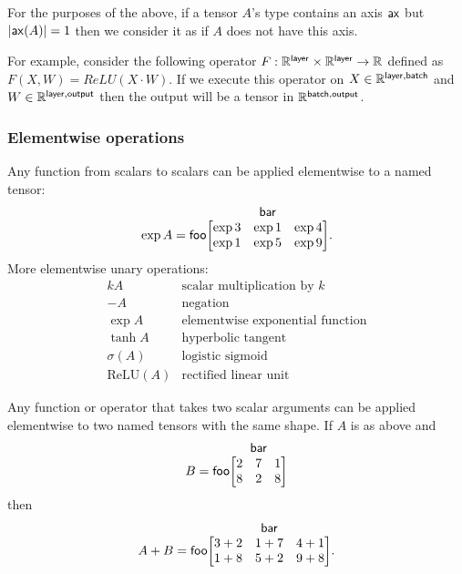 \documentclass{article}
\makeatletter
\newcommand{\nmatrix}[3]{\name{#1}\begin{array}[b]{@{}c@{}}\name{#2}\\\begin{bmatrix}#3\end{bmatrix}\end{array}}
\makeatother
\begin{document}
For the purposes of the above, if a tensor  $A$'s type contains an axis $\mathsf{ax}$ but $|\mathsf{ax}(A)|=1$ then we consider it as if $A$ does not have this axis.



For example, consider the following operator $F:\mathbb{R}^{\mathsf{layer}}\times \mathbb{R}^{\mathsf{layer}} \rightarrow \mathbb{R}$ defined as $F(X,W) = ReLU(X \cdot W)$. If we execute this operator on $X\in \mathbb{R}^{\mathsf{layer},\mathsf{batch}}$ and  $W \in \mathbb{R}^{\mathsf{layer},\mathsf{output}}$ then the output will be a tensor in $\mathbb{R}^{\mathsf{batch},\mathsf{output}}$.




\subsubsection{Elementwise operations}

Any function from scalars to scalars can be applied elementwise to a named tensor:
\begin{equation*}
\exp A = \nmatrix{foo}{bar}{
  \exp 3 & \exp 1 & \exp 4 \\
  \exp 1 & \exp 5 & \exp 9
}.
\end{equation*}
More elementwise unary operations:
\[\begin{array}{cl}
kA & \text{scalar multiplication by $k$} \\
-A & \text{negation} \\
\exp A & \text{elementwise exponential function} \\
\tanh A & \text{hyperbolic tangent} \\
\sigma(A) & \text{logistic sigmoid} \\
\text{ReLU}(A) & \text{rectified linear unit}
\end{array}\]

Any function or operator that takes two scalar arguments can be applied elementwise to two named tensors with the same shape. If $A$ is as above and
\begin{equation*}
B = \nmatrix{foo}{bar}{
  2 & 7 & 1 \\
  8 & 2 & 8
}
\end{equation*}
then
\begin{equation*}
A + B = \nmatrix{foo}{bar}{
  3+2 & 1+7 & 4+1 \\
  1+8 & 5+2 & 9+8
}.
\end{equation*}
\end{document}
